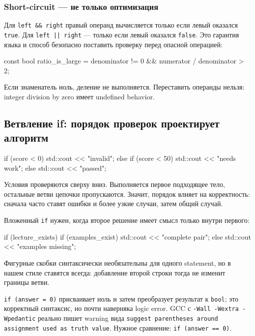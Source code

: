 \subsubsection{Short-circuit --- не только оптимизация}

Для \texttt{left \&\& right} правый операнд вычисляется только если левый
оказался \texttt{true}. Для \texttt{left || right} --- только если левый
оказался \texttt{false}. Это гарантия языка и способ безопасно поставить
проверку перед опасной операцией:

\begin{cppcode}
const bool ratio_is_large = denominator != 0 && numerator / denominator > 2;
\end{cppcode}

Если знаменатель ноль, деление не выполняется. Переставить операнды нельзя:
integer division by zero имеет undefined behavior.

\subsection{Ветвление if: порядок проверок проектирует алгоритм}

\begin{cppcode}
if (score < 0) {
    std::cout << "invalid\n";
} else if (score < 50) {
    std::cout << "needs work\n";
} else {
    std::cout << "passed\n";
}
\end{cppcode}

Условия проверяются сверху вниз. Выполняется первое подходящее тело, остальные
ветви цепочки пропускаются. Значит, порядок влияет на корректность:
сначала часто ставят ошибки и более узкие случаи, затем общий случай.

Вложенный \texttt{if} нужен, когда второе решение имеет смысл только внутри
первого:

\begin{cppcode}
if (lecture_exists) {
    if (examples_exist) {
        std::cout << "complete pair\n";
    } else {
        std::cout << "examples missing\n";
    }
}
\end{cppcode}

Фигурные скобки синтаксически необязательны для одного statement, но в нашем
стиле ставятся всегда: добавление второй строки тогда не изменит границы ветви.

\begin{mistakebox}
\texttt{if (answer = 0)} присваивает ноль и затем преобразует результат к
\texttt{bool}; это корректный синтаксис, но почти наверняка logic error.
GCC с \texttt{-Wall -Wextra -Wpedantic} реально пишет warning вида
\texttt{suggest parentheses around assignment used as truth value}.
Нужное сравнение: \texttt{if (answer == 0)}.
\end{mistakebox}

